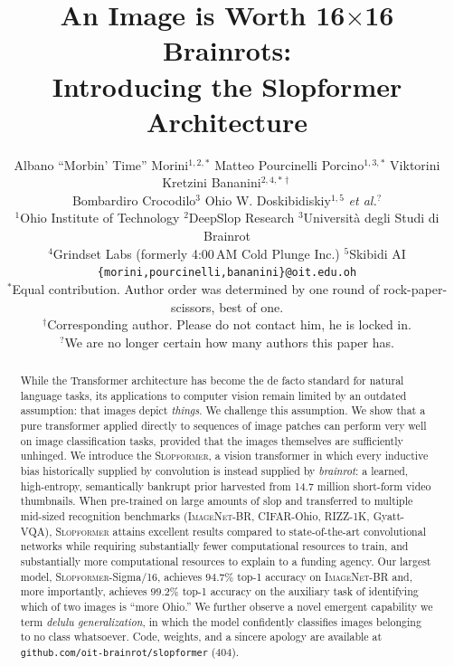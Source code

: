 \documentclass[10pt]{article}
\title{\bf An Image is Worth 16$\times$16 Brainrots:\\ Introducing the Slopformer Architecture}
\author{
  Albano ``Morbin' Time'' Morini$^{1,2,\ast}$ \quad
  Matteo Pourcinelli Porcino$^{1,3,\ast}$ \quad
  Viktorini Kretzini Bananini$^{2,4,\ast\dagger}$\\[0.5em]
  Bombardiro Crocodilo$^{3}$ \quad Ohio W. Doskibidiskiy$^{1,5}$ \quad
  \textit{et al.}$^{?}$\\[0.7em]
  $^{1}$Ohio Institute of Technology \quad $^{2}$DeepSlop Research \quad
  $^{3}$Universit\`a degli Studi di Brainrot\\
  $^{4}$Grindset Labs (formerly 4:00\,AM Cold Plunge Inc.) \quad $^{5}$Skibidi AI\\[0.4em]
  \texttt{\{morini,pourcinelli,bananini\}@oit.edu.oh}\\[0.4em]
  {\small $^{\ast}$Equal contribution. Author order was determined by one round
  of rock-paper-scissors, best of one.}\\
  {\small $^{\dagger}$Corresponding author. Please do not contact him, he is locked in.}\\
  {\small $^{?}$We are no longer certain how many authors this paper has.}
}
\date{}
\newcommand{\slop}{\textsc{Slopformer}}
\newcommand{\br}{\textsc{ImageNet-BR}}
\begin{document}
\maketitle
\thispagestyle{fancy}

\begin{abstract}
\noindent
While the Transformer architecture has become the de facto standard for natural
language tasks, its applications to computer vision remain limited by an
outdated assumption: that images depict \emph{things}. We challenge this
assumption. We show that a pure transformer applied directly to sequences of
image patches can perform very well on image classification tasks, provided
that the images themselves are sufficiently unhinged. We introduce the
\slop{}, a vision transformer in which every inductive bias historically
supplied by convolution is instead supplied by \emph{brainrot}: a learned,
high-entropy, semantically bankrupt prior harvested from 14.7 million
short-form video thumbnails. When pre-trained on large amounts of slop and
transferred to multiple mid-sized recognition benchmarks
(\br{}, CIFAR-Ohio, RIZZ-1K, Gyatt-VQA), \slop{} attains excellent results
compared to state-of-the-art convolutional networks while requiring
substantially fewer computational resources to train, and substantially more
computational resources to explain to a funding agency. Our largest model,
\slop{}-Sigma/16, achieves $94.7\%$ top-1 accuracy on \br{} and, more
importantly, achieves $99.2\%$ top-1 accuracy on the auxiliary task of
identifying which of two images is ``more Ohio.'' We further observe a novel
emergent capability we term \emph{delulu generalization}, in which the model
confidently classifies images belonging to no class whatsoever. Code, weights,
and a sincere apology are available at
\texttt{github.com/oit-brainrot/slopformer} (404).
\end{abstract}
\end{document}
